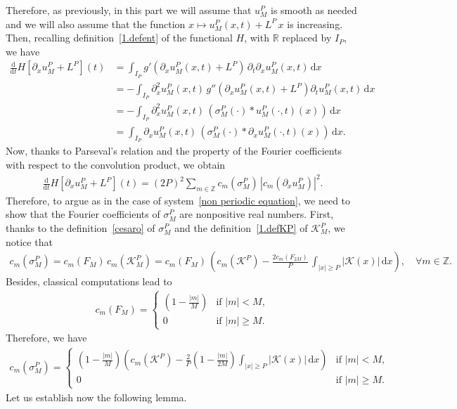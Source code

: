 \documentclass[11pt]{amsart}
\newcommand{\K}{\mathcal{K}}
\newcommand{\dd}{\mathrm{d}}
\newcommand{\pa}{\partial}
\newcommand{\R}{\mathbb{R}}
\newcommand{\Z}{\mathbb{Z}}
\begin{document}
 
Therefore, as previously, in this part we will assume that $u^P_M$ is smooth as needed and we will also assume that the function $x \mapsto u^P_M(x,t) + L^P\, x$ is increasing. Then, recalling definition~\eqref{1.defent} of the functional $H$, with $\R$ replaced by $I_P$, we have
\begin{align*}
    \frac{\dd}{\dd t}H\left[\pa_x u^P_M + L^P\right](t) & = 
    \int_{I_P} g'(\pa_x u^P_M(x,t)+L^P)\, \pa_t \pa_x u^P_M(x,t) \, \dd x\\
    &= -\int_{I_P} \pa_x^2 u^P_M(x,t)\, g''(\pa_x u^P_M(x,t) + L^P) \pa_t u^P_M(x,t) \, \dd x\\
    &= -\int_{I_P} \pa_x^2 u^P_M(x,t) \, \left(\sigma_M^P(\cdot) \ast u^P_M(\cdot,t)(x) \right) \, \dd x\\
    &= \int_{I_P} \pa_x u^P_M(x,t) \, \left(\sigma_M^P(\cdot) \ast \pa_x u^P_M(\cdot,t)(x)  \right) \, \dd x.
\end{align*}
Now, thanks to Parseval's relation and the property of the Fourier coefficients with respect to the convolution product, we obtain
\begin{align*}
    \frac{\dd}{\dd t} H\left[\pa_x u^P_M + L^P\right](t)= (2P)^2 \sum_{m \in \Z} c_m(\sigma_M^P) \, \left|c_m(\pa_x u^P_M)\right|^2.
\end{align*}
Therefore, to argue as in the case of system~\eqref{non periodic equation}, we need to show that the Fourier coefficients of $\sigma_M^P$ are nonpositive real numbers. First, thanks to the definition~\eqref{cesaro} of $\sigma_M^P$ and the definition~\eqref{1.defKP} of $\K^P_M$, we notice that
\begin{align*}
    c_m(\sigma_M^P) = c_m(F_M) \, c_m(\K^P_M) = c_m(F_M) \, \left(c_m(\K^P) - \frac{2c_m(F_{2M})}{P} \, \int_{|x|\geq P} |\K(x)| \, \dd x \right), \quad \forall m \in \Z.
\end{align*}
Besides, classical computations lead to
\begin{align*}
    c_m(F_M) =
    \left\{
    \begin{array}{ll}
        \left(1-\frac{|m|}{M}\right) & \mbox{if } |m| < M, \\
        0 & \mbox{if } |m|\geq M.
    \end{array}
\right.
\end{align*}
Therefore, we have
\begin{align}\label{auxcoeffFouriercesaro}
    c_m(\sigma_M^P) =
        \left\{
    \begin{array}{ll}
       \left(1-\frac{|m|}{M}\right)\left(c_m(\K^P) - 
       \frac{2}{P}\left(1-\frac{|m|}{2M}\right) \displaystyle\int_{|x|\geq P} |\K(x)| \, \dd x\right) & \mbox{if } |m|< M, \\
        0 & \mbox{if } |m|\geq M.
    \end{array}
    \right.
\end{align}
Let us establish now the following lemma. 
\end{document}
